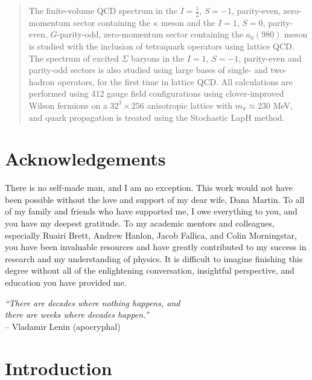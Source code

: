 \documentclass[12pt]{report}
\begin{document}
\onehalfspace


\begin{abstract}
    The finite-volume QCD spectrum in the $I=\frac{1}{2}$, $S=-1$, parity-even, zero-momentum sector containing the $\kappa$ meson and the $I=1$, $S=0$, parity-even, $G$-parity-odd, zero-momentum sector containing the $a_0(980)$ meson is studied with the inclusion of tetraquark operators using lattice QCD. The spectrum of excited $\Sigma$ baryons in the $I=1$, $S=-1$, parity-even and parity-odd sectors is also studied using large bases of single- and two-hadron operators, for the first time in lattice QCD. All calculations are performed using 412 gauge field configurations using clover-improved Wilson fermions on a $32^3\times 256$ anisotropic lattice with $m_\pi \approx 230$ MeV, and quark propagation is treated using the Stochastic LapH method. 
\end{abstract}

\chapter*{Acknowledgements}
There is no self-made man, and I am no exception. This work would not have been possible without the love and support of my dear wife, Dana Martin. To all of my family and friends who have supported me, I owe everything to you, and you have my deepest gratitude. To my academic mentors and colleagues, especially Ruair\'i Brett, Andrew Hanlon, Jacob Fallica, and Colin Morningstar, you have been invaluable resources and have greatly contributed to my success in research and my understanding of physics. It is difficult to imagine finishing this degree without all of the enlightening conversation, insightful perspective, and education you have provided me.
\newpage
\null
\vfill
\begin{flushright}
    \textit{``There are decades where nothing happens, and\\
    there are weeks where decades happen.''}\\
    -- Vladamir Lenin (apocryphal)
\end{flushright}
\vfill
\tableofcontents
\listoffigures
\listoftables
\chapter{Introduction}\label{ch:introduction}

\end{document}
